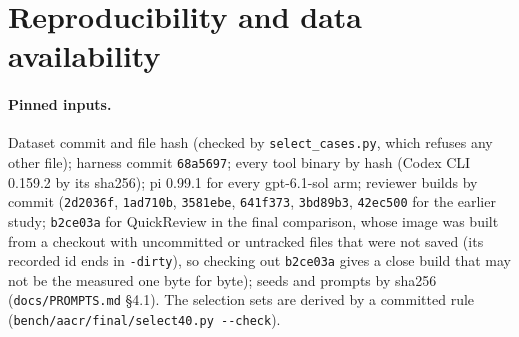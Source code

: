 \documentclass[11pt,a4paper]{article}
\newcommand{\qcr}{QuickReview}
\newcommand{\code}[1]{\texttt{#1}}
\begin{document}
\section{Reproducibility and data availability}
\label{sec:repro}

\paragraph{Pinned inputs.} Dataset commit and file hash (checked by
\code{select\_cases.py}, which refuses any other file); harness commit
\code{68a5697}; every tool binary by hash (Codex CLI 0.159.2 by its sha256);
pi 0.99.1 for every gpt-6.1-sol arm; reviewer builds by commit
(\code{2d2036f}, \code{1ad710b}, \code{3581ebe}, \code{641f373},
\code{3bd89b3}, \code{42ec500} for the earlier study; \code{b2ce03a} for
\qcr{} in the final comparison, whose image was built from a checkout with
uncommitted or untracked files that were not saved (its recorded id ends in
\code{-dirty}), so checking out \code{b2ce03a} gives a close build that may
not be the measured one byte for byte); seeds and prompts by sha256
(\code{docs/PROMPTS.md} \S4.1). The selection sets are derived by a
committed rule (\code{bench/aacr/final/select40.py -{}-check}).
\end{document}
